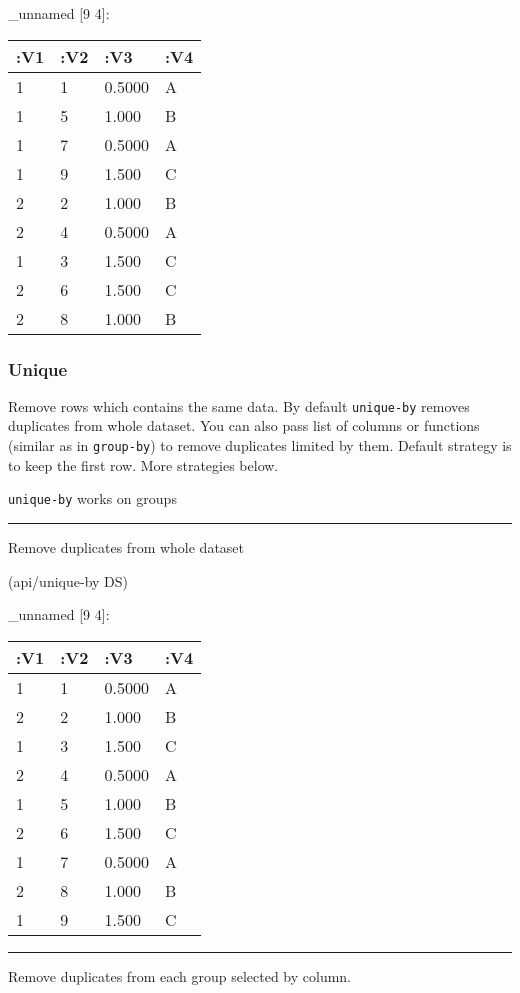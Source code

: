 \documentclass[]{article}
\newenvironment{Shaded}{\begin{snugshade}}{\end{snugshade}}
\newcommand{\NormalTok}[1]{#1}
\begin{document}
\_unnamed {[}9 4{]}:

\begin{longtable}[]{@{}llll@{}}
\toprule
:V1 & :V2 & :V3 & :V4\tabularnewline
\midrule
\endhead
1 & 1 & 0.5000 & A\tabularnewline
1 & 5 & 1.000 & B\tabularnewline
1 & 7 & 0.5000 & A\tabularnewline
1 & 9 & 1.500 & C\tabularnewline
2 & 2 & 1.000 & B\tabularnewline
2 & 4 & 0.5000 & A\tabularnewline
1 & 3 & 1.500 & C\tabularnewline
2 & 6 & 1.500 & C\tabularnewline
2 & 8 & 1.000 & B\tabularnewline
\bottomrule
\end{longtable}

\subsubsection{Unique}\label{unique}

Remove rows which contains the same data. By default \texttt{unique-by}
removes duplicates from whole dataset. You can also pass list of columns
or functions (similar as in \texttt{group-by}) to remove duplicates
limited by them. Default strategy is to keep the first row. More
strategies below.

\texttt{unique-by} works on groups

\begin{center}\rule{0.5\linewidth}{0.5pt}\end{center}

Remove duplicates from whole dataset

\begin{Shaded}
\begin{Highlighting}[]
\NormalTok{(api/unique-by DS)}
\end{Highlighting}
\end{Shaded}

\_unnamed {[}9 4{]}:

\begin{longtable}[]{@{}llll@{}}
\toprule
:V1 & :V2 & :V3 & :V4\tabularnewline
\midrule
\endhead
1 & 1 & 0.5000 & A\tabularnewline
2 & 2 & 1.000 & B\tabularnewline
1 & 3 & 1.500 & C\tabularnewline
2 & 4 & 0.5000 & A\tabularnewline
1 & 5 & 1.000 & B\tabularnewline
2 & 6 & 1.500 & C\tabularnewline
1 & 7 & 0.5000 & A\tabularnewline
2 & 8 & 1.000 & B\tabularnewline
1 & 9 & 1.500 & C\tabularnewline
\bottomrule
\end{longtable}

\begin{center}\rule{0.5\linewidth}{0.5pt}\end{center}

Remove duplicates from each group selected by column.
\end{document}
